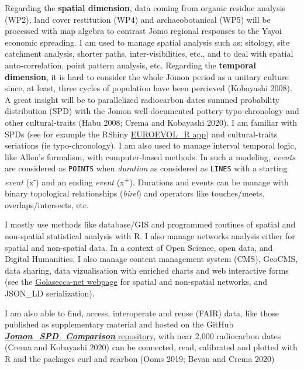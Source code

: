 \documentclass[
]{article}
\newcommand{\pkg}[1]{{\fontseries{m}\fontseries{b}\selectfont #1}}
\begin{document}
Regarding the \textbf{spatial dimension}, data coming from organic
residue analysis (WP2), land cover restitution (WP4) and
archaeobotanical (WP5) will be processed with map algebra to contrast
Jōmo regional responses to the Yayoi economic spreading. I am used to
manage spatial analysis such as: sitology, site catchment analysis,
shorter paths, inter-visibilities, etc., and to deal with spatial
auto-correlation, point pattern analysis, etc. Regarding the
\textbf{temporal dimension}, it is hard to consider the whole Jōmon
period as a unitary culture since, at least, three cycles of population
have been percieved (Kobayashi 2008). A great insight will be to
parallelized radiocarbon dates summed probability distribution (SPD)
with the Jomon well-documented pottery typo-chronology and other
cultural-traits (Habu 2008; Crema and Kobayashi 2020). I am familiar
with SPDs (see for example the RShiny
\href{https://neolithic.shinyapps.io/Euroevol_R/}{EUROEVOL\_R app}) and
cultural-traits seriations (ie typo-chronology). I am also used to
manage interval temporal logic, like Allen's formalism, with
computer-based methods. In such a modeling, \emph{events} are considered
as \texttt{POINTS} when \emph{duration} as considered as \texttt{LINES}
with a starting \emph{event} (x\textsuperscript{-}) and an ending
\emph{event} (x\textsuperscript{+}). Durations and events can be manage
with binary topological relationships (\emph{birel}) and operators like
touches/meets, overlaps/intersects, etc.

I mostly use methods like database/GIS and programmed routines of
spatial and non-spatial statistical analysis with \textsf{R}. I also
manage networks analysis either for spatial and non-spatial data. In a
context of Open Science, open data, and Digital Humanities, I also
manage content management system (CMS), GeoCMS, data sharing, data
vizualisation with enriched charts and web interactive forms (see the
\href{https://zoometh.github.io/golasecca/}{Golasecca-net webpage} for
spatial and non-spatial networks, and JSON\_LD serialization).

I am also able to find, access, interoperate and reuse (FAIR) data, like
those published as supplementary material and hosted on the GitHub
\href{https://github.com/ercrema/jomonPhasesAndPopulation}{\textbf{\emph{Jomon\_SPD\_Comparison}}
repository}, with near 2,000 radiocarbon dates (Crema and Kobayashi
2020) can be connected, read, calibrated and plotted with \textsf{R} and
the packages \pkg{curl} and \pkg{rcarbon} (Ooms 2019; Bevan and Crema
2020)\\
\hspace*{0.333em}
\end{document}
